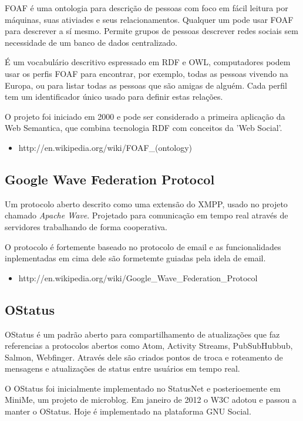 \documentclass[12pt]{article}
\begin{document}
FOAF é uma ontologia para descrição de pessoas com foco em fácil leitura por
máquinas, suas ativiades e seus relacionamentos. Qualquer um pode usar FOAF
para descrever a sí mesmo. Permite grupos de pessoas descrever redes sociais
sem necessidade de um banco de dados centralizado.

É um vocabulário descritivo espressado em RDF e OWL, computadores podem
usar os perfis FOAF para encontrar, por exemplo, todas as pessoas vivendo na
Europa, ou para listar todas as pessoas que são amigas de alguém. Cada perfil
tem um identificador único usado para definir estas relações.

O projeto foi iniciado em 2000 e pode ser considerado a primeira aplicação da
Web Semantica, que combina tecnologia RDF com conceitos da 'Web Social'.

\begin{itemize}
  \item http://en.wikipedia.org/wiki/FOAF\_(ontology)
\end{itemize}

\subsection{Google Wave Federation Protocol}

Um protocolo aberto descrito como uma extensão do XMPP\cite{xmpp}, usado
no projeto chamado {\it Apache Wave}\cite{wave}. Projetado para comunicação em
tempo real através de servidores trabalhando de forma cooperativa.

O protocolo é fortemente baseado no protocolo de email e as funcionalidades
inplementadas em cima dele são formetemte guiadas pela idela de email.

\begin{itemize}
  \item http://en.wikipedia.org/wiki/Google\_Wave\_Federation\_Protocol
\end{itemize}

\subsection{OStatus}

OStatus é um padrão aberto para compartilhamento de atualizações que faz
referencias a protocolos abertos como Atom, Activity Streams, PubSubHubbub,
Salmon, Webfinger. Através dele são criados pontos de troca e roteamento de
mensagens e atualizações de status entre usuários em tempo real.

O OStatus foi inicialmente implementado no StatusNet e posterioemente em
MiniMe, um projeto de microblog. Em janeiro de 2012 o W3C adotou e passou a
manter o OStatus. Hoje é implementado na plataforma GNU Social.
\end{document}

